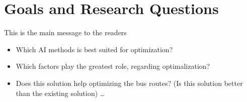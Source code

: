 \section{Goals and Research Questions}
This is the main message to the readers
\begin{itemize}
  \item Which AI methods is best suited for optimization?
  \item Which factors play the greatest role, regarding optimalization?
  \item Does this solution help optimizing the bus routes? (Is this solution better than the existing solution)
   \ldots
\end{itemize}
